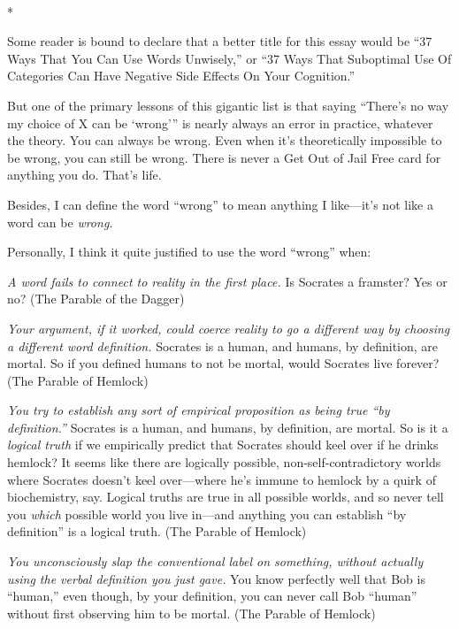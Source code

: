 {\centering
 \ ~
\par}

{\centering
 *
\par}


{
 Some reader is bound to declare that a better title for this essay
would be ``37 Ways That You Can Use Words
Unwisely,'' or ``37 Ways That
Suboptimal Use Of Categories Can Have Negative Side Effects On Your
Cognition.'' }

{
 But one of the primary lessons of this gigantic list is that
saying ``There's no way my choice of X
can be `wrong''' is
nearly always an error in practice, whatever the theory. You can always
be wrong. Even when it's theoretically impossible to be
wrong, you can still be wrong. There is never a Get Out of Jail Free
card for anything you do. That's life.}

{
 Besides, I can define the word
``wrong'' to mean anything I
like---it's not like a word can be \textit{wrong.}}

{
 Personally, I think it quite justified to use the word
``wrong'' when:}

{
 \textit{A word fails to connect to reality in the first place.} Is
Socrates a framster? Yes or no? (The Parable of the Dagger)}

{
 \textit{Your argument, if it worked, could coerce reality to go a
different way by choosing a different word definition.} Socrates is a
human, and humans, by definition, are mortal. So if you defined humans
to not be mortal, would Socrates live forever? (The Parable of
Hemlock)}

{
 \textit{You try to establish any sort of empirical proposition as
being true ``by definition.''}
Socrates is a human, and humans, by definition, are mortal. So is it a
\textit{logical truth} if we empirically predict that Socrates should
keel over if he drinks hemlock? It seems like there are logically
possible, non-self-contradictory worlds where Socrates
doesn't keel over---where he's immune
to hemlock by a quirk of biochemistry, say. Logical truths are true in
all possible worlds, and so never tell you \textit{which} possible
world you live in---and anything you can establish
``by definition'' is a logical
truth. (The Parable of Hemlock)}

{
 \textit{You unconsciously slap the conventional label on
something, without actually using the verbal definition you just gave.}
You know perfectly well that Bob is
``human,'' even though, by your
definition, you can never call Bob
``human'' without first observing
him to be mortal. (The Parable of Hemlock)}

